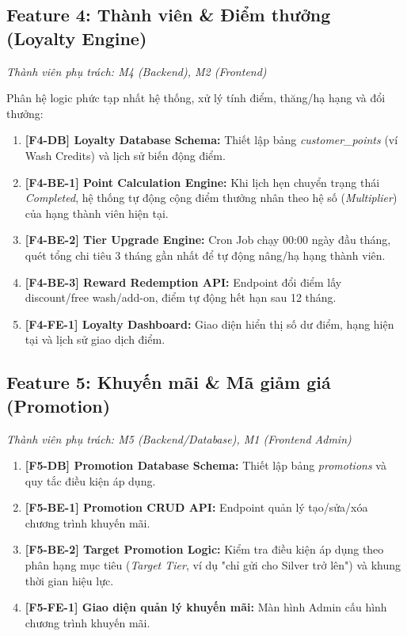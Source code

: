 \subsection{Feature 4: Thành viên \& Điểm thưởng (Loyalty Engine)}
\textit{Thành viên phụ trách: M4 (Backend), M2 (Frontend)}

Phân hệ logic phức tạp nhất hệ thống, xử lý tính điểm, thăng/hạ hạng và đổi thưởng:
\begin{enumerate}
    \item \textbf{[F4-DB] Loyalty Database Schema:} Thiết lập bảng \textit{customer\_points} (ví Wash Credits) và lịch sử biến động điểm.
    \item \textbf{[F4-BE-1] Point Calculation Engine:} Khi lịch hẹn chuyển trạng thái \textit{Completed}, hệ thống tự động cộng điểm thưởng nhân theo hệ số (\textit{Multiplier}) của hạng thành viên hiện tại.
    \item \textbf{[F4-BE-2] Tier Upgrade Engine:} Cron Job chạy 00:00 ngày đầu tháng, quét tổng chi tiêu 3 tháng gần nhất để tự động nâng/hạ hạng thành viên.
    \item \textbf{[F4-BE-3] Reward Redemption API:} Endpoint đổi điểm lấy discount/free wash/add-on, điểm tự động hết hạn sau 12 tháng.
    \item \textbf{[F4-FE-1] Loyalty Dashboard:} Giao diện hiển thị số dư điểm, hạng hiện tại và lịch sử giao dịch điểm.
\end{enumerate}

\subsection{Feature 5: Khuyến mãi \& Mã giảm giá (Promotion)}
\textit{Thành viên phụ trách: M5 (Backend/Database), M1 (Frontend Admin)}

\begin{enumerate}
    \item \textbf{[F5-DB] Promotion Database Schema:} Thiết lập bảng \textit{promotions} và quy tắc điều kiện áp dụng.
    \item \textbf{[F5-BE-1] Promotion CRUD API:} Endpoint quản lý tạo/sửa/xóa chương trình khuyến mãi.
    \item \textbf{[F5-BE-2] Target Promotion Logic:} Kiểm tra điều kiện áp dụng theo phân hạng mục tiêu (\textit{Target Tier}, ví dụ "chỉ gửi cho Silver trở lên") và khung thời gian hiệu lực.
    \item \textbf{[F5-FE-1] Giao diện quản lý khuyến mãi:} Màn hình Admin cấu hình chương trình khuyến mãi.
\end{enumerate}

